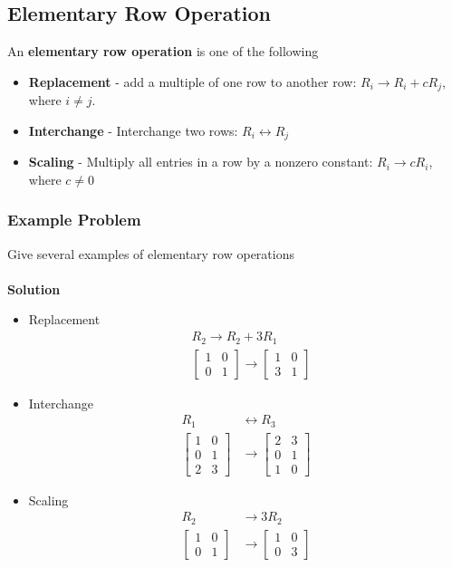 \subsection{Elementary Row Operation}
An \textbf{elementary row operation} is one of the following
\begin{itemize}
  \item \textbf{Replacement} - add a multiple of one row to another row: $R_i \rightarrow R_i + cR_j$, where $i \neq j$.
  \item \textbf{Interchange} - Interchange two rows: $R_i \leftrightarrow R_j$
  \item \textbf{Scaling} - Multiply all entries in a row by a nonzero constant: $R_i \rightarrow cR_i$, where $c \neq 0$
\end{itemize}
\subsubsection{Example Problem}
Give several examples of elementary row operations \\\\
\textbf{Solution}
\begin{itemize}
  \item Replacement
  \[  
    \begin{align}
      &R_2 \rightarrow R_2 + 3R_1 \\
      &\begin{bmatrix}
        1 & 0 \\
        0 & 1
      \end{bmatrix} \rightarrow
      \begin{bmatrix}
        1 & 0 \\
        3 & 1
      \end{bmatrix}
    \end{align}
  \]
  \item Interchange
  \[
    \begin{align}
      R_1 &\leftrightarrow R_3 \\  
      \begin{bmatrix}
        1 & 0 \\
        0 & 1 \\
        2 & 3
      \end{bmatrix} &\rightarrow
      \begin{bmatrix}
        2 & 3 \\
        0 & 1 \\
        1 & 0
      \end{bmatrix}
    \end{align}
  \]
  \item Scaling
  \[
    \begin{align}
      R_2 &\rightarrow 3R_2 \\    
      \begin{bmatrix}
        1 & 0 \\
        0 & 1
      \end{bmatrix} &\rightarrow 
      \begin{bmatrix}
        1 & 0 \\
        0 & 3
      \end{bmatrix}
    \end{align}
  \]
\end{itemize}
